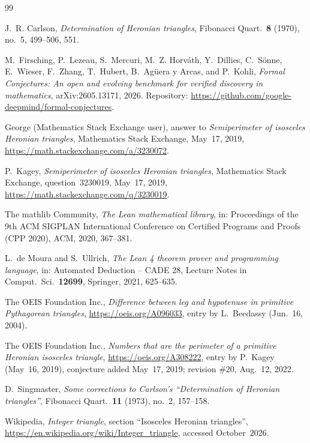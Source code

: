 \documentclass[11pt]{amsart}
\theoremstyle{plain}
\theoremstyle{definition}
\begin{document}
{\small
\begin{thebibliography}{99}

J.~R. Carlson, \emph{Determination of Heronian triangles}, Fibonacci Quart.\ \textbf{8} (1970), no.~5, 499--506, 551.

M.~Firsching, P.~Lezeau, S.~Mercuri, M.~Z. Horv\'ath, Y.~Dillies, C.~S\"onne, E.~Wieser, F.~Zhang, T.~Hubert, B.~Ag\"uera y Arcas, and P.~Kohli, \emph{Formal Conjectures: An open and evolving benchmark for verified discovery in mathematics}, arXiv:2605.13171, 2026. Repository: \url{https://github.com/google-deepmind/formal-conjectures}.

George (Mathematics Stack Exchange user), answer to \emph{Semiperimeter of isosceles Heronian triangles}, Mathematics Stack Exchange, May~17, 2019, \url{https://math.stackexchange.com/a/3230072}.

P.~Kagey, \emph{Semiperimeter of isosceles Heronian triangles}, Mathematics Stack Exchange, question~3230019, May~17, 2019, \url{https://math.stackexchange.com/q/3230019}.

The mathlib Community, \emph{The Lean mathematical library}, in: Proceedings of the 9th ACM SIGPLAN International Conference on Certified Programs and Proofs (CPP 2020), ACM, 2020, 367--381.

L.~de Moura and S.~Ullrich, \emph{The Lean 4 theorem prover and programming language}, in: Automated Deduction -- CADE 28, Lecture Notes in Comput.\ Sci.\ \textbf{12699}, Springer, 2021, 625--635.

The OEIS Foundation Inc., \emph{Difference between leg and hypotenuse in primitive Pythagorean triangles}, \url{https://oeis.org/A096033}, entry by L.~Beedassy (Jun.~16, 2004).

The OEIS Foundation Inc., \emph{Numbers that are the perimeter of a primitive Heronian isosceles triangle}, \url{https://oeis.org/A308222}, entry by P.~Kagey (May~16, 2019), conjecture added May~17, 2019; revision \#20, Aug.~12, 2022.

D.~Singmaster, \emph{Some corrections to Carlson's ``Determination of Heronian triangles''}, Fibonacci Quart.\ \textbf{11} (1973), no.~2, 157--158.

Wikipedia, \emph{Integer triangle}, section ``Isosceles Heronian triangles'', \url{https://en.wikipedia.org/wiki/Integer_triangle}, accessed October~2026.

\end{thebibliography}
}
\end{document}
